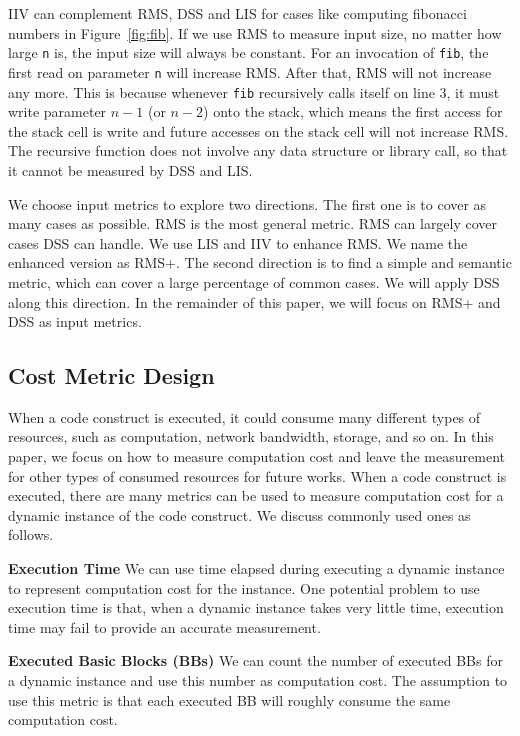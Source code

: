 IIV can complement RMS, DSS and LIS for cases like 
computing fibonacci numbers in Figure~\ref{fig:fib}. 
If we use RMS to measure input size,
no matter how large \texttt{n} is, the input size will always be constant. 
For an invocation of \texttt{fib},
the first read on parameter \texttt{n} will increase RMS.
After that, RMS will not increase any more.
This is because whenever \texttt{fib} recursively calls itself on line 3,
it must write parameter $n-1$ (or $n-2$) onto the stack, 
which means the first access for the stack cell is write 
and future accesses on the stack cell will not increase RMS. 
The recursive function does not
involve any data structure or library call, 
so that it cannot be measured by DSS and LIS. 
 

We choose input metrics to explore two directions. 
The first one is to cover as many cases as possible. 
RMS is the most general metric.
RMS can largely cover cases DSS can handle.
We use LIS and IIV to enhance RMS.
We name the enhanced version as RMS+.
The second direction is to find a simple and semantic metric, 
which can cover a large percentage of common cases. 
We will apply DSS along this direction. 
In the remainder of this paper, 
we will focus on RMS+ and DSS as input metrics. 

\subsection{Cost Metric Design}
When a code construct is executed, 
it could consume many different types of resources, 
such as computation, network bandwidth, storage, and so on.
In this paper, we focus on how to measure computation cost and 
leave the measurement for other types of consumed resources for future works. 
When a code construct is executed, 
there are many metrics can be used to measure computation 
cost for a dynamic instance of the code construct. 
We discuss commonly used ones as follows.

\noindent\textbf{Execution Time}
We can use time elapsed during executing a dynamic instance to represent computation cost 
for the instance.
One potential problem to use execution time is that, 
when a dynamic instance takes very little time, 
execution time may fail to provide an accurate measurement.  

\noindent\textbf{Executed Basic Blocks (BBs)}
We can count the number of executed BBs for a dynamic instance
and use this number as computation cost. 
The assumption to use this metric is that 
each executed BB will roughly consume the same computation cost. 

